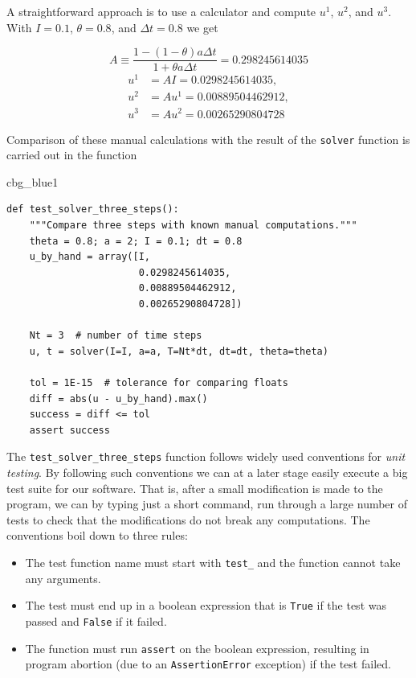 \documentclass[%
oneside,                 %
final,                   %
10pt]{article}
\newenvironment{_cod_tight}[1]{
   \def\FrameCommand{\colorbox{#1}}
   \FrameRule0.6pt\MakeFramed {\FrameRestore}\vskip3mm}
   {\vskip0mm\endMakeFramed}
\newenvironment{cod}[1]{
\bgroup\rmfamily
\fboxsep=0mm\relax
\begin{_cod_tight}{#1}
\list{}{\parsep=-2mm\parskip=0mm\topsep=0pt\leftmargin=2mm
\rightmargin=2\leftmargin\leftmargin=4pt\relax}
\item\relax}
{\endlist\end{_cod_tight}\egroup}
\begin{document}
A straightforward approach is to use a calculator and
compute $u^1$, $u^2$, and $u^3$. With $I=0.1$, $\theta=0.8$,
and $\Delta t =0.8$ we get

\[ A\equiv \frac{1 - (1-\theta) a\Delta t}{1 + \theta a \Delta t} = 0.298245614035\]
\begin{align*}
u^1 &= AI=0.0298245614035,\\ 
u^2 &= Au^1= 0.00889504462912,\\ 
u^3 &=Au^2= 0.00265290804728
\end{align*}

Comparison of these manual calculations with the result of the
\texttt{solver} function is carried out in the function

\begin{cod}{cbg_blue1}\begin{Verbatim}[numbers=none,fontsize=\fontsize{9pt}{9pt},baselinestretch=0.95,xleftmargin=2mm]
def test_solver_three_steps():
    """Compare three steps with known manual computations."""
    theta = 0.8; a = 2; I = 0.1; dt = 0.8
    u_by_hand = array([I,
                       0.0298245614035,
                       0.00889504462912,
                       0.00265290804728])

    Nt = 3  # number of time steps
    u, t = solver(I=I, a=a, T=Nt*dt, dt=dt, theta=theta)

    tol = 1E-15  # tolerance for comparing floats
    diff = abs(u - u_by_hand).max()
    success = diff <= tol
    assert success
\end{Verbatim}
\end{cod}
\noindent
The \Verb!test_solver_three_steps! function follows widely used conventions
for \emph{unit testing}. By following such conventions we can at a later
stage easily execute a big test suite for our software. That is, after
a small modification is made to the program, we can by typing just
a short command, run through a large number of tests to check that the
modifications do not break any computations.
The conventions boil down to three rules:

\begin{itemize}
 \item The test function name must start with \Verb!test_! and the function
   cannot take any arguments.

 \item The test must end up in a boolean expression that is \texttt{True} if
   the test was passed and \texttt{False} if it failed.

 \item The function must run \texttt{assert} on the boolean expression, resulting
   in program abortion (due to an \texttt{AssertionError} exception) if
   the test failed.
\end{itemize}
\end{document}
